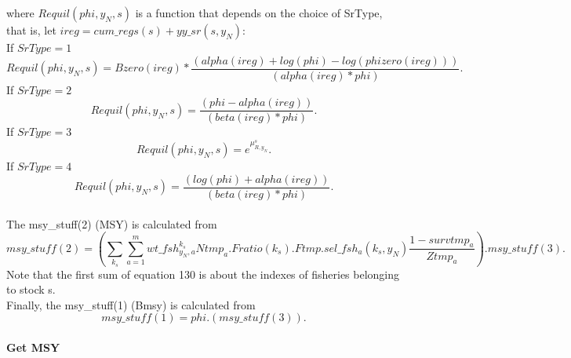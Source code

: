 \documentclass{article}
\begin{document}
where $Requil(phi,y_N,s)$ is a function that depends on the choice of SrType, that is, let $ireg=cum\_regs(s)+yy\_sr(s,y_N)$:\\
If $SrType=1$
\begin{equation}
    Requil(phi,y_N,s)=Bzero(ireg) * \dfrac{(alpha(ireg) + log(phi) - log(phizero(ireg)) )}  {(alpha(ireg)*phi)}.
\end{equation}
If $SrType=2$
\begin{equation}
Requil(phi,y_N,s)=\dfrac{(phi-alpha(ireg))}{(beta(ireg)*phi)}.
\end{equation}
If $SrType=3$
\begin{equation}
    Requil(phi,y_N,s)=e^{\mu^s_{R,y_N}}.
\end{equation}
If $SrType=4$
\begin{equation}
    Requil(phi,y_N,s)=\dfrac{(log(phi)+alpha(ireg))}{(beta(ireg)*phi)}.
\end{equation}
\\
The msy\_stuff(2) (MSY) is calculated from
\begin{equation}
    msy\_stuff(2)=\left(\sum_{k_s}\sum_{a=1}^m wt\_fsh^{k_s}_{y_N,a}Ntmp_a.Fratio(k_s).Ftmp.sel\_fsh_a(k_s,y_N)\dfrac{1-survtmp_a}{Ztmp_a}\right).msy\_stuff(3).
\end{equation}
Note that the first sum of equation 130 is about the indexes of fisheries belonging to stock s.\\
Finally, the msy\_stuff(1) (Bmsy) is calculated from
\begin{equation}
    msy\_stuff(1)=phi.(msy\_stuff(3)).
\end{equation}
\\
\textbf{Get MSY}\\
\end{document}
